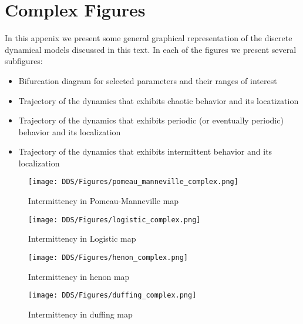 \chapter{Complex Figures}
\label{sec:Appendix_complex_figures}
In this appenix we present some general graphical representation of the discrete dynamical models discussed in this text.
In each of the figures we present several subfigures:
\begin{itemize}
  \item Bifurcation diagram for selected parameters and their ranges of interest
  \item Trajectory of the dynamics that exhibits chaotic behavior and its locatization
  \item Trajectory of the dynamics that exhibits periodic (or eventually periodic) behavior and its localization
  \item Trajectory of the dynamics that exhibits intermittent behavior and its localization
\end{itemize}

\begin{figure}[!ht]
	\centering
	\texttt{[image: DDS/Figures/pomeau\_manneville\_complex.png]}
	\caption{Intermittency in Pomeau-Manneville map}
	\label{fig:complex_pomeau_manneville}
\end{figure}

\begin{figure}[!ht]
	\centering
	\texttt{[image: DDS/Figures/logistic\_complex.png]}
	\caption{Intermittency in Logistic map}
	\label{fig:complex_logistic}
\end{figure}

\begin{figure}[!ht]
	\centering
	\texttt{[image: DDS/Figures/henon\_complex.png]}
	\caption{Intermittency in henon map}
	\label{fig:complex_henon}
\end{figure}

\begin{figure}[!ht]
	\centering
	\texttt{[image: DDS/Figures/duffing\_complex.png]}
	\caption{Intermittency in duffing map}
	\label{fig:complex_duffing}
\end{figure}

\endinput